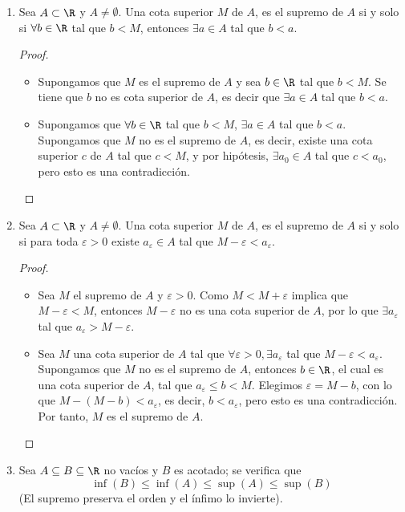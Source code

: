 \begin{enumerate}[label=\alph*)]
 \item Sea $A\subset \R$ y $A\neq \emptyset$. Una cota superior $M$ de $A$, es el supremo de $A$ si y solo si $\forall b\in \R$ tal que $b<M$, entonces $\exists a\in A$ tal que $b<a$.
 \begin{proof}\leavevmode
 \begin{itemize}
 \item[$\Rightarrow)$] Supongamos que $M$ es el supremo de $A$ y sea $b\in \R$ tal que $b<M$. Se tiene que $b$ no es cota superior de $A$, es decir que $\exists a\in A$ tal que $b<a$.
 \item[$\Leftarrow)$] Supongamos que $\forall b\in \R$ tal que $b<M$, $\exists a\in A$ tal que $b<a$. Supongamos que $M$ no es el supremo de $A$, es decir, existe una cota superior $c$ de $A$ tal que $c<M$, y por hipótesis, $\exists a_0\in A$ tal que $c<a_0$, pero esto es una contradicción. \qedhere
 \end{itemize}
 \end{proof}

 \item Sea $A\subset \R$ y $A\neq \emptyset$. Una cota superior $M$ de $A$, es el supremo de $A$ si y solo si para toda $\varepsilon>0$ existe $a_\varepsilon \in A$ tal que $M-\varepsilon<a_\varepsilon$.

  \begin{proof}\leavevmode
  \begin{itemize}
  \item[$\Rightarrow)$] Sea $M$ el supremo de $A$ y $\varepsilon>0$. Como $M<M+\varepsilon$ implica que $M-\varepsilon<M$, entonces $M-\varepsilon$ no es una cota superior de $A$, por lo que $\exists a_\varepsilon$ tal que $a_\varepsilon>M-\varepsilon$.
  \item[$\Leftarrow)$] Sea $M$ una cota superior de $A$ tal que $\forall \varepsilon>0, \exists a_{\varepsilon}$ tal que $M-\varepsilon<a_{\varepsilon}$. Supongamos que $M$ no es el supremo de $A$, entonces $b\in \R$, el cual es una cota superior de $A$, tal que $a_\varepsilon \leq b < M$. Elegimos $\varepsilon = M-b$, con lo que $M-(M-b)<a_\varepsilon$, es decir, $b<a_{\varepsilon}$, pero esto es una contradicción. Por tanto, $M$ es el supremo de $A$. \qedhere
  \end{itemize}
  \end{proof}
  
\item Sea $A\subseteq B\subseteq \R$ no vacíos y $B$ es acotado; se verifica que \[\inf (B) \leq \inf (A) \leq \sup (A) \leq \sup (B)\] (El supremo preserva el orden y el ínfimo lo invierte).


\end{enumerate}
